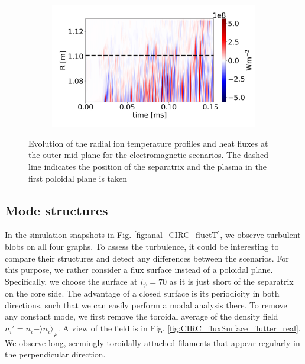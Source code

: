 \begin{figure}[H]
\begin{subfigure}[t]{0.45\textwidth}
	\end{subfigure}
	\begin{subfigure}[t]{0.45\textwidth}
		\centering
		\includegraphics[width=1\textwidth]{schemes/plotOMPtime_spec1_fluxE_psi_flutter.jpg}
	\end{subfigure}
	\caption{Evolution of the radial ion temperature profiles and heat fluxes at the outer mid-plane for the electromagnetic scenarios. The dashed line indicates the position of the separatrix and the plasma in the first poloidal plane is taken}
	\label{fig:CIRC_EM_OMPevolution}
\end{figure}



\subsection{Mode structures}

In the simulation snapshots in Fig. \ref{fig:anal_CIRC_fluctT}, we observe turbulent blobs on all four graphs. To assess the turbulence, it could be interesting to compare their structures and detect any differences between the scenarios. For this purpose, we rather consider a flux surface instead of a poloidal plane. Specifically, we choose the surface at $i_\psi=70$ as it is just short of the separatrix on the core side. The advantage of a closed surface is its periodicity in both directions, such that we can easily perform a modal analysis there. To remove any constant mode, we first remove the toroidal average of the density field $n_i' = n_i-\rangle n_i\rangle_\varphi$. A view of the field is in Fig. \ref{fig:CIRC_fluxSurface_flutter_real}. We observe long, seemingly toroidally attached filaments that appear regularly in the perpendicular direction. \newline 

